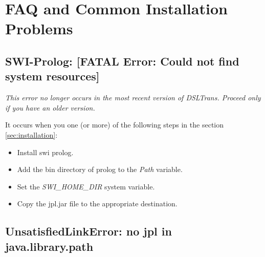 ﻿\section{FAQ and Common Installation Problems}
\label{sec:faq}

\subsection{SWI-Prolog: [FATAL Error: Could not find system resources]}

\emph{This error no longer occurs in the most recent version of DSLTrans.
Proceed only if you have an older version.
}

It occurs when you one (or more) of the following steps in the section \ref{sec:installation}:
\begin{itemize}
\item Install swi prolog.
\item Add the bin directory of prolog to the \emph{Path} variable.
\item Set the \emph{SWI\_HOME\_DIR} system variable.
\item Copy the jpl.jar file to the appropriate destination.
\end{itemize}

\subsection{UnsatisfiedLinkError: no jpl in java.library.path}


